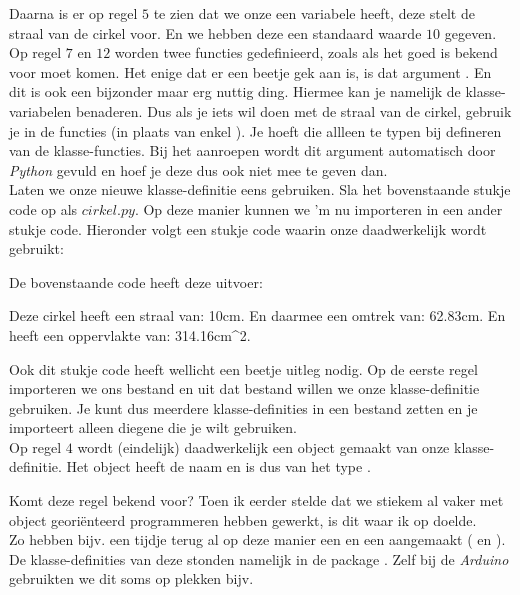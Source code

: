 Daarna is er op regel $5$ te zien dat we onze  een variabele  heeft, deze stelt de straal van de cirkel voor. En we hebben deze een standaard waarde $10$ gegeven. \\

Op regel $7$ en $12$ worden twee functies gedefinieerd, zoals als het goed is bekend voor moet komen. Het enige dat er een beetje gek aan is, is dat argument . En dit is ook een bijzonder maar erg nuttig ding. Hiermee kan je namelijk de klasse-variabelen benaderen. Dus als je iets wil doen met de straal van de cirkel, gebruik je in de functies  (in plaats van enkel ). Je hoeft die  allleen te typen bij defineren van de klasse-functies. Bij het aanroepen wordt dit argument automatisch door \textit{Python} gevuld en hoef je deze dus ook niet mee te geven dan. \\

Laten we onze nieuwe klasse-definitie eens gebruiken. Sla het bovenstaande stukje code op als $cirkel.py$. Op deze manier kunnen we 'm nu importeren in een ander stukje code. Hieronder volgt een stukje code waarin onze  daadwerkelijk wordt gebruikt:


De bovenstaande code heeft deze uitvoer:
\begin{python}
Deze cirkel heeft een straal van: 10cm.
En daarmee een omtrek van: 62.83cm.
En heeft een oppervlakte van: 314.16cm^2.
\end{python}

Ook dit stukje code heeft wellicht een beetje uitleg nodig. Op de eerste regel importeren we ons bestand  en uit dat bestand willen we onze klasse-definitie  gebruiken. Je kunt dus meerdere klasse-definities in een bestand zetten en je importeert alleen diegene die je wilt gebruiken. \\ 

Op regel $4$ wordt (eindelijk) daadwerkelijk een object gemaakt van onze klasse-definitie. Het object heeft de naam  en is dus van het type . 

\begin{remark} 
Komt deze regel bekend voor? Toen ik eerder stelde dat we stiekem al vaker met object georiënteerd programmeren hebben gewerkt, is dit waar ik op doelde. \\
Zo hebben bijv. een tijdje terug al op deze manier een  en een  aangemaakt ( en ). De klasse-definities van deze stonden namelijk in de package . Zelf bij de \textit{Arduino} gebruikten we dit soms op plekken bijv. 
\end{remark}

